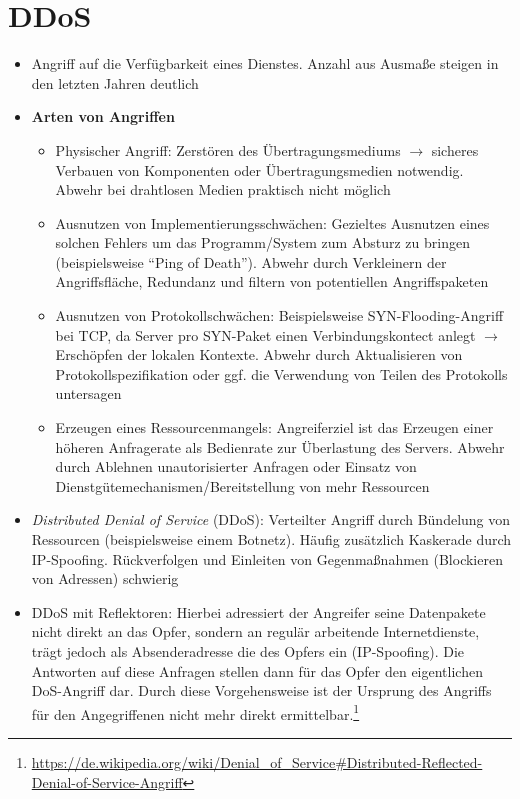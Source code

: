 \section{DDoS}
\begin{itemize}
	\item Angriff auf die Verfügbarkeit eines Dienstes. Anzahl aus Ausmaße steigen in den letzten Jahren deutlich
	\item \textbf{Arten von Angriffen}
	\begin{itemize}
		\item Physischer Angriff: Zerstören des Übertragungsmediums \(\rightarrow\) sicheres Verbauen von Komponenten oder Übertragungsmedien notwendig. Abwehr bei drahtlosen Medien praktisch nicht möglich
		\item Ausnutzen von Implementierungsschwächen: Gezieltes Ausnutzen eines solchen Fehlers um das Programm/System zum Absturz zu bringen (beispielsweise "`Ping of Death"'). Abwehr durch Verkleinern der Angriffsfläche, Redundanz und filtern von potentiellen Angriffspaketen
		\item Ausnutzen von Protokollschwächen: Beispielsweise SYN-Flooding-Angriff bei TCP, da Server pro SYN-Paket einen Verbindungskontect anlegt \(\rightarrow\) Erschöpfen der lokalen Kontexte. Abwehr durch Aktualisieren von Protokollspezifikation oder ggf. die Verwendung von Teilen des Protokolls untersagen
		\item Erzeugen eines Ressourcenmangels: Angreiferziel ist das Erzeugen einer höheren Anfragerate als Bedienrate zur Überlastung des Servers. Abwehr durch Ablehnen unautorisierter Anfragen oder Einsatz von Dienstgütemechanismen/Bereitstellung von mehr Ressourcen
	\end{itemize}
	\item \textit{Distributed Denial of Service} (DDoS): Verteilter Angriff durch Bündelung von Ressourcen (beispielsweise einem Botnetz). Häufig zusätzlich Kaskerade durch IP-Spoofing. Rückverfolgen und Einleiten von Gegenmaßnahmen (Blockieren von Adressen) schwierig
	\item DDoS mit Reflektoren: Hierbei adressiert der Angreifer seine Datenpakete nicht direkt an das Opfer, sondern an regulär arbeitende Internetdienste, trägt jedoch als Absenderadresse die des Opfers ein (IP-Spoofing). Die Antworten auf diese Anfragen stellen dann für das Opfer den eigentlichen DoS-Angriff dar. Durch diese Vorgehensweise ist der Ursprung des Angriffs für den Angegriffenen nicht mehr direkt ermittelbar.\footnote{\url{https://de.wikipedia.org/wiki/Denial_of_Service\#Distributed-Reflected-Denial-of-Service-Angriff}}

\end{itemize}
